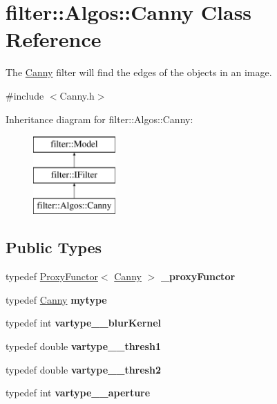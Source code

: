 \hypertarget{classfilter_1_1_algos_1_1_canny}{}\section{filter\+:\+:Algos\+:\+:Canny Class Reference}
\label{classfilter_1_1_algos_1_1_canny}


The \hyperlink{classfilter_1_1_algos_1_1_canny}{Canny} filter will find the edges of the objects in an image.  




{\ttfamily \#include $<$Canny.\+h$>$}

Inheritance diagram for filter\+:\+:Algos\+:\+:Canny\+:\begin{figure}[H]
\begin{center}
\leavevmode
\includegraphics[height=3.000000cm]{d8/de8/classfilter_1_1_algos_1_1_canny}
\end{center}
\end{figure}
\subsection*{Public Types}
\begin{DoxyCompactItemize}
\item 
\mbox{\label{classfilter_1_1_algos_1_1_canny_ae1d95aa394e60bb92b3f6c8fa6abf40f}} 
typedef \hyperlink{class_proxy_functor}{Proxy\+Functor}$<$ \hyperlink{classfilter_1_1_algos_1_1_canny}{Canny} $>$ {\bfseries \+\_\+proxy\+Functor}
\item 
\mbox{\label{classfilter_1_1_algos_1_1_canny_a39bfd0de9c93097e83e36094ef8a632c}} 
typedef \hyperlink{classfilter_1_1_algos_1_1_canny}{Canny} {\bfseries mytype}
\item 
\mbox{\label{classfilter_1_1_algos_1_1_canny_a2086d352adc936a92251db68c98fc57d}} 
typedef int {\bfseries vartype\+\_\+\+\_\+blur\+Kernel}
\item 
\mbox{\label{classfilter_1_1_algos_1_1_canny_a0b231b846f5683be7a8cf02725d2305e}} 
typedef double {\bfseries vartype\+\_\+\+\_\+thresh1}
\item 
\mbox{\label{classfilter_1_1_algos_1_1_canny_a368c9c004b7df6527498c7bb43928fe3}} 
typedef double {\bfseries vartype\+\_\+\+\_\+thresh2}
\item 
\mbox{\label{classfilter_1_1_algos_1_1_canny_aa3e0af034c4b0e299f9bc61363931ee6}} 
typedef int {\bfseries vartype\+\_\+\+\_\+aperture}
\end{DoxyCompactItemize}
